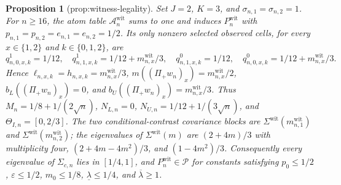 \documentclass{article}
\newtheorem{proposition}{Proposition}
\begin{document}
\begin{proposition}[prop:witness-legality]\label{prop:witness-legality}
Set \(J=2\), \(K=3\), and \(\sigma_{n,1}=\sigma_{n,2}=1\). For \(n\ge16\), the atom table \(\mathcal A_n^{\mathrm{wit}}\) sums to one and induces \(P_n^{\mathrm{wit}}\) with \(p_{n,1}=p_{n,2}=e_{n,1}=e_{n,2}=1/2\). Its only nonzero selected observed cells, for every \(x\in\{1,2\}\) and \(k\in\{0,1,2\}\), are \[q^1_{n,0,x,k}=1/12,\quad q^1_{n,1,x,k}=1/12+m^{\mathrm{wit}}_{n,x}/3,\quad q^0_{n,1,x,k}=1/12,\quad q^0_{n,0,x,k}=1/12+m^{\mathrm{wit}}_{n,x}/3.\] Hence \(\ell_{n,x,k}=h_{n,x,k}=m^{\mathrm{wit}}_{n,x}/3\), \(m((\Pi_+w_n)_x)=m^{\mathrm{wit}}_{n,x}/2\), \(b_L((\Pi_+w_n)_x)=0\), and \(b_U((\Pi_+w_n)_x)=m^{\mathrm{wit}}_{n,x}/3\). Thus \(M_n=1/8+1/(2\sqrt n)\), \(N_{L,n}=0\), \(N_{U,n}=1/12+1/(3\sqrt n)\), and \(\Theta_{I,n}=[0,2/3]\). The two conditional-contrast covariance blocks are \(\Sigma^{\mathrm{wit}}(m^{\mathrm{wit}}_{n,1})\) and \(\Sigma^{\mathrm{wit}}(m^{\mathrm{wit}}_{n,2})\); the eigenvalues of \(\Sigma^{\mathrm{wit}}(m)\) are \((2+4m)/3\) with multiplicity four, \((2+4m-4m^2)/3\), and \((1-4m^2)/3\). Consequently every eigenvalue of \(\Sigma_{c,n}\) lies in \([1/4,1]\), and \(P_n^{\mathrm{wit}}\in\mathcal P\) for constants satisfying \(p_0\le1/2\), \(\varepsilon\le1/2\), \(m_0\le1/8\), \(\underline\lambda\le1/4\), and \(\overline\lambda\ge1\).
\end{proposition}
\end{document}
